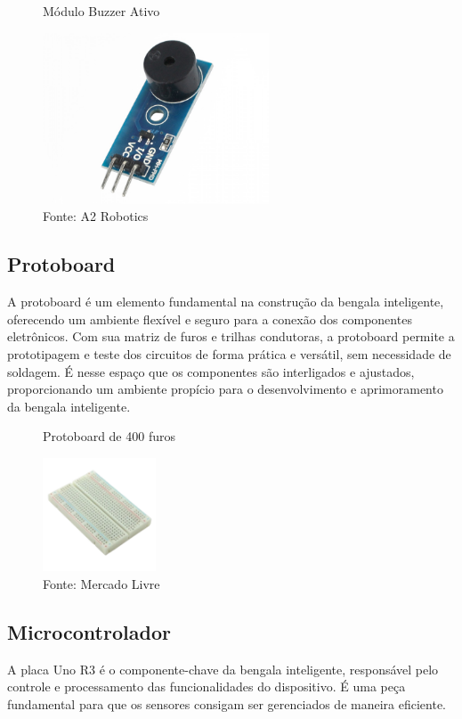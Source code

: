        \begin{figure}[h!]
        \captionsetup{width=1\textwidth}
        \caption{\label{fig:buzzer}Módulo Buzzer Ativo}
        \centering
        \includegraphics[width=0.6\textwidth]{figuras/buzzer} 
        \caption*{Fonte: A2 Robotics}
    \end{figure}

    \subsection{Protoboard}
    A protoboard é um elemento fundamental na construção da bengala inteligente, oferecendo um ambiente flexível e seguro para a conexão dos componentes eletrônicos. Com sua matriz de furos e trilhas condutoras, a protoboard permite a prototipagem e teste dos circuitos de forma prática e versátil, sem necessidade de soldagem. É nesse espaço que os componentes são interligados e ajustados, proporcionando um ambiente propício para o desenvolvimento e aprimoramento da bengala inteligente.

    \begin{figure}[h!]
        \captionsetup{width=1\textwidth}
        \caption{\label{fig:protoboard} Protoboard de 400 furos}
        \centering
        \includegraphics[width=0.3\textwidth]{figuras/protoboard} 
        \caption*{Fonte: Mercado Livre}
    \end{figure}

    \subsection{Microcontrolador}
    A placa Uno R3 é o componente-chave da bengala inteligente, responsável pelo controle e processamento das funcionalidades do dispositivo. É uma peça fundamental para que os sensores consigam ser gerenciados de maneira eficiente. 

